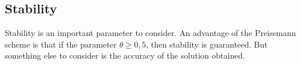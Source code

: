 \subsection{Stability} \label{stability}

Stability is an important parameter to consider. An advantage of the Preissmann scheme is that if the parameter $\theta \geq 0,5$, then stability is guaranteed.
But something else to consider is the accuracy of the solution obtained. 
